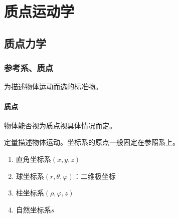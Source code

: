 \documentclass[
	12pt, %
	a4paper, %
]{myLegrandOrangeBook}
\begin{document}

\chapterspaceabove{6.75cm} %
\chapterspacebelow{7.25cm} %


\chapter{质点运动学}

\section{质点力学}

\subsection{参考系、质点}

    \vspace{1em}
    \begin{definition}[参考系]
        为描述物体运动而选的标准物。
    \end{definition}

\subsubsection*{质点}

    物体能否视为质点视具体情况而定。

    \vspace{1em}
    \begin{definition}[坐标系]
        定量描述物体运动。坐标系的原点一般固定在参照系上。

    \begin{enumerate}
        \item 直角坐标系\(\left(x,y,z\right)\)
        \item 球坐标系\(\left(r,\theta,\varphi\right)\)：二维极坐标
        \item 柱坐标系\(\left(\rho,\varphi,z\right)\)
        \item 自然坐标系\(s\)
    \end{enumerate}
    \end{definition}
\end{document}
